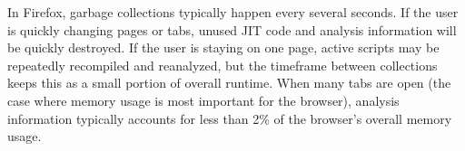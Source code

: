 In Firefox, garbage collections typically happen every several seconds.
If the user is quickly changing pages or tabs, unused JIT code and analysis
information will be quickly destroyed.
If the user is staying on one page, active scripts may be repeatedly
recompiled and reanalyzed, but the timeframe between collections keeps this
as a small portion of overall runtime.
When many tabs are open (the case where memory usage is most important
for the browser), analysis information typically accounts
for less than 2\% of the browser's overall memory usage.
